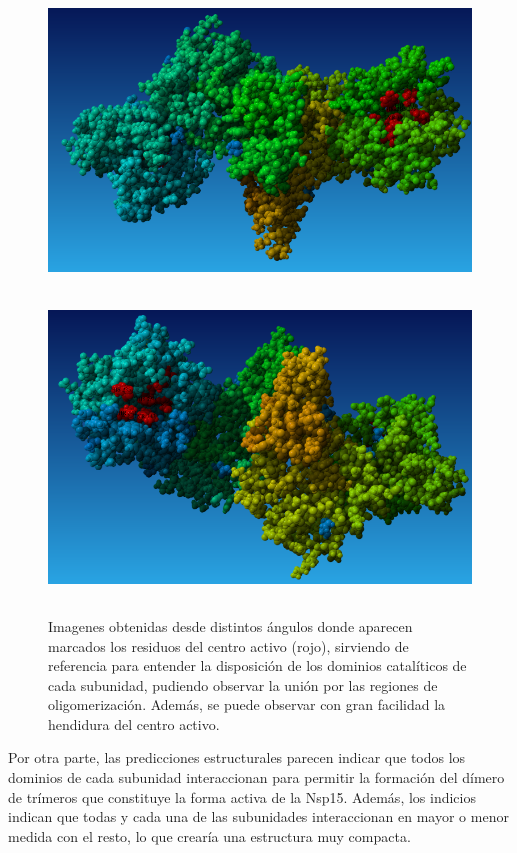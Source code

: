 \documentclass[12pt]{article}
\begin{document}
\begin{figure}[H]
\centering
\includegraphics[width=1\textwidth, height=8cm]{Screenshot_15}
\includegraphics[width=1\textwidth, height=8cm]{Screenshot_16}
\caption{Imagenes obtenidas desde distintos ángulos donde aparecen marcados los residuos del centro activo (rojo), sirviendo de referencia para entender la disposición de los dominios catalíticos de cada subunidad, pudiendo observar la unión por las regiones de oligomerización. Además, se puede observar con gran facilidad la hendidura del centro activo.}
\end{figure}

Por otra parte, las predicciones estructurales parecen indicar que todos los dominios de cada subunidad interaccionan para permitir la formación del dímero de trímeros que constituye la forma activa de la Nsp15. Además, los indicios indican que todas y cada una de las subunidades interaccionan en mayor o menor medida con el resto, lo que crearía una estructura muy compacta.
\newline
\end{document}
